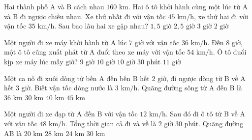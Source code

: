 \begin{ex} %
Hai thành phố A và B cách nhau $160\text{ km}$. Hai ô tô khởi hành cùng một lúc từ A và B đi ngược chiều nhau. Xe thứ nhất đi với vận tốc $45\text{ km/h}$, xe thứ hai đi với vận tốc $35\text{ km/h}$. Sau bao lâu hai xe gặp nhau?
\choice
{$1{,}5\text{ giờ}$}
{$2{,}5\text{ giờ}$}
{$3\text{ giờ}$}
{\True $2\text{ giờ}$}
\end{ex}

\begin{ex} %
Một người đi xe máy khởi hành từ A lúc $7$ giờ với vận tốc $36\text{ km/h}$. Đến $8$ giờ, một ô tô cũng xuất phát từ A đuổi theo xe máy với vận tốc $54\text{ km/h}$. Ô tô đuổi kịp xe máy lúc mấy giờ?
\choice
{$9$ giờ}
{\True $10$ giờ}
{$10$ giờ $30$ phút}
{$11$ giờ}
\end{ex}

\begin{ex} %
Một ca nô đi xuôi dòng từ bến A đến bến B hết $2$ giờ, đi ngược dòng từ B về A hết $3$ giờ. Biết vận tốc dòng nước là $3\text{ km/h}$. Quãng đường sông từ A đến B là
\choice
{\True $36\text{ km}$}
{$30\text{ km}$}
{$40\text{ km}$}
{$45\text{ km}$}
\end{ex}

\begin{ex} %
Một người đi xe đạp từ A đến B với vận tốc $12\text{ km/h}$. Sau đó đi ô tô từ B về A với vận tốc $48\text{ km/h}$. Tổng thời gian cả đi và về là $2$ giờ $30$ phút. Quãng đường AB là
\choice
{$20\text{ km}$}
{$28\text{ km}$}
{\True $24\text{ km}$}
{$30\text{ km}$}
\end{ex}

